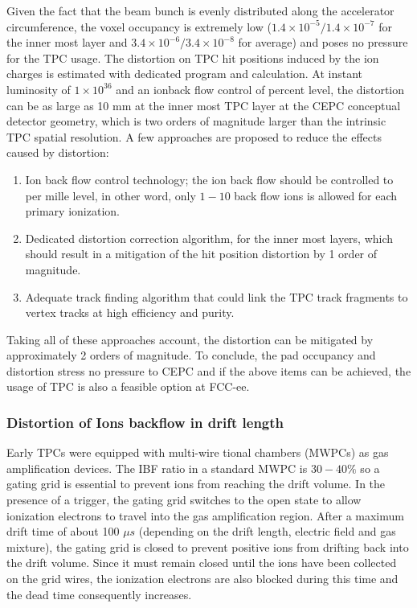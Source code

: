 Given the fact that the beam bunch is evenly distributed along the accelerator circumference,
the voxel occupancy is extremely low ($1.4\times 10^{-5}/1.4\times 10^{-7}$ for the inner most layer and $3.4 \times 10^{-6}/3.4 \times 10^{-8}$ for average) and poses no pressure for the TPC usage. The distortion on TPC hit positions induced by the ion charges is estimated with dedicated
program and calculation. At instant luminosity of $1 \times 10^{36}$ and an ionback flow control of percent level, the distortion can be as large as 10 mm at the inner most TPC layer at the CEPC conceptual detector geometry, which is two orders of magnitude larger than the intrinsic TPC spatial resolution.
A few approaches are proposed to reduce the effects caused by distortion:
\begin{enumerate}
\item Ion back flow control technology; the ion back flow should be controlled to per mille level, in other word, only $1-10$ back flow ions is allowed for each primary ionization.
\item Dedicated distortion correction algorithm, for the inner most layers, which should result in a mitigation of the hit position distortion by 1 order of magnitude.
\item Adequate track finding algorithm that could link the TPC track fragments to vertex tracks at high efficiency and purity.
\end{enumerate}

Taking all of these approaches account, the distortion can be mitigated by approximately 2
orders of magnitude. To conclude, the pad occupancy and distortion stress no pressure to CEPC
and if the above items can be achieved, the usage of TPC is also a feasible option at FCC-ee.

\subsubsection{Distortion of Ions backflow in drift length}
Early TPCs were equipped with multi-wire tional chambers (MWPCs) as gas amplification devices. The IBF ratio in a standard MWPC is $30-40\%$ so a gating grid is essential to prevent ions from  reaching the drift volume. In the presence of a trigger, the gating grid switches to the open state to allow ionization electrons to travel into the gas amplification region.
After a maximum drift time of about 100 $\mu s$ (depending on the drift length, electric field and gas mixture), the gating grid is closed to prevent positive ions from drifting back into the drift volume. Since it must remain closed until the ions have been collected on the grid wires, the ionization electrons are also blocked during this time and the dead time consequently increases.

